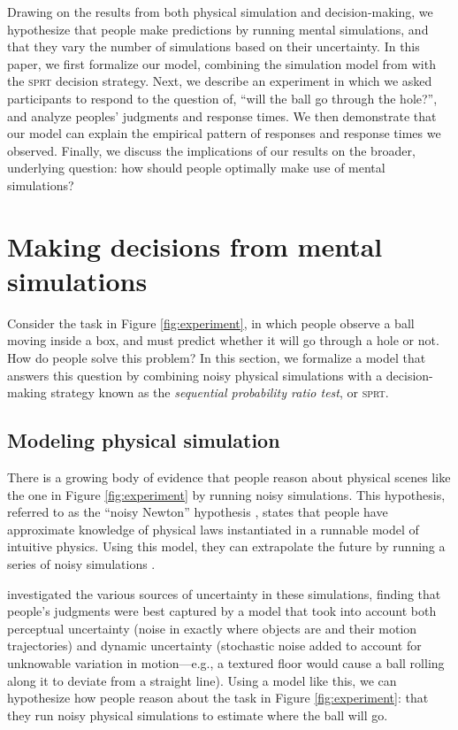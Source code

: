 \documentclass[10pt,letterpaper]{article}
\begin{document}
Drawing on the results from both physical simulation and decision-making, we hypothesize that people make predictions by running mental simulations, and that they vary the number of simulations based on their uncertainty.
In this paper, we first formalize our model, combining the simulation model from  with the \textsc{sprt} decision strategy. 
Next, we describe an experiment in which we asked participants to respond to the question of, ``will the ball go through the hole?'', and analyze peoples' judgments and response times. 
We then demonstrate that our model can explain the empirical pattern of responses and response times we observed. 
Finally, we discuss the implications of our results on the broader, underlying question: how should people optimally make use of mental simulations?

\section{Making decisions from mental simulations}

Consider the task in Figure \ref{fig:experiment}, in which people observe a ball moving inside a box, and must predict whether it will go through a hole or not.
How do people solve this problem?
In this section, we formalize a model that answers this question by combining noisy physical simulations with a decision-making strategy known as the \emph{sequential probability ratio test}, or \textsc{sprt}.

\subsection{Modeling physical simulation}

There is a growing body of evidence that people reason about physical scenes like the one in Figure \ref{fig:experiment} by running noisy simulations.
This hypothesis, referred to as the ``noisy Newton'' hypothesis \cite{Sanborn2013}, states that people have approximate knowledge of physical laws instantiated in a runnable model of intuitive physics.
Using this model, they can extrapolate the future by running a series of noisy simulations \cite{Smith:2013fc,Battaglia2013,Smith:2013ug,Smith:2013th,Smith:2014tx,Ullman:2014ut,Hamrick:2015}.

 investigated the various sources of uncertainty in these simulations, finding that people's judgments were best captured by a model that took into account both perceptual uncertainty (noise in exactly where objects are and their motion trajectories) and dynamic uncertainty (stochastic noise added to account for unknowable variation in motion---e.g., a textured floor would cause a ball rolling along it to deviate from a straight line).
Using a model like this, we can hypothesize how people reason about the task in Figure \ref{fig:experiment}: that they run noisy physical simulations to estimate where the ball will go.
\end{document}
